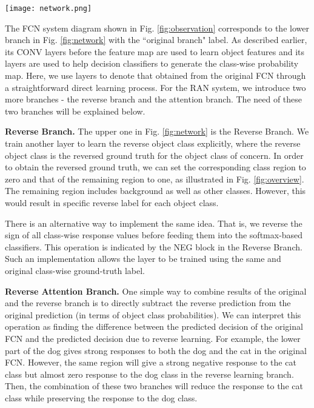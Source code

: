 \documentclass[runningheads]{llncs}
\begin{document}
\begin{figure*}
\begin{center}
\texttt{[image: network.png]}
\end{center}
\caption{The system diagram of the reverse attention network (RAN), where
 and  filters are used to learn features associated and
not associated with a particular class, respectively.  The reverse object 
class knowledge is then highlighted by an attention mask to generate the
reverse attention of a class, which will then be subtracted from the
original prediction score as a correction.} \label{fig:network}
\end{figure*}


The FCN system diagram shown in Fig. \ref{fig:observation} corresponds
to the lower branch in Fig. \ref{fig:network} with the ``original
branch" label. As described earlier, its CONV layers before the feature
map are used to learn object features and its  layers are used
to help decision classifiers to generate the class-wise probability map.
Here, we use  layers to denote that obtained from the original
FCN through a straightforward direct learning process.  For the RAN
system, we introduce two more branches - the reverse branch and the
attention branch. The need of these two branches will be explained
below.

{\bf Reverse Branch.} The upper one in Fig. \ref{fig:network} is the
Reverse Branch. We train another  layer to learn the reverse
object class explicitly, where the reverse object class is the reversed
ground truth for the object class of concern. In order to obtain the
reversed ground truth, we can set the corresponding class region to zero
and that of the remaining region to one, as illustrated in Fig. \ref{fig:overview}. The remaining region includes
background as well as other classes. However, this would result in specific reverse label for each object class.

There is an alternative way to
implement the same idea. That is, we reverse the sign of all class-wise
response values before feeding them into the softmax-based classifiers.
This operation is indicated by the NEG block in the Reverse Branch. Such
an implementation allows the  layer to be trained using the same
and original class-wise ground-truth label. 

{\bf Reverse Attention Branch.} 
One simple way to combine results of the original and the reverse
branch is to directly subtract the reverse prediction from the original prediction (in terms of object class
probabilities). We can interpret this operation as finding the
difference between the predicted decision of the original FCN and the
predicted decision due to reverse learning. For example, the lower part
of the dog gives strong responses to both the dog and the cat in the
original FCN. However, the same region will give a strong negative
response to the cat class but almost zero response to the dog class in
the reverse learning branch. Then, the combination of these two branches
will reduce the response to the cat class while preserving the response
to the dog class.
\end{document}
